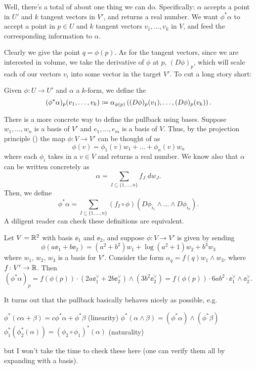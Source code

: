 Well, there's a total of about one thing we can do.
Specifically: $\alpha$ accepts a point in $U'$ and $k$ tangent vectors in $V'$,
and returns a real number.
We want $\phi^\ast \alpha$ to accept a point in $p \in U$
and $k$ tangent vectors $v_1, \dots, v_k$ in $V$,
and feed the corresponding information to $\alpha$.

Clearly we give the point $q = \phi(p)$.
As for the tangent vectors, since we are interested in volume, we take the
derivative of $\phi$ at $p$, $(D\phi)_p$, which will scale each of our vectors $v_i$
into some vector in the target $V'$.
To cut a long story short:
\begin{definition}
	Given $\phi \colon U \to U'$ and $\alpha$ a $k$-form, we define the 
	\[
		(\phi^\ast \alpha)_p(v_1, \dots, v_k)
		\coloneqq \alpha_{\phi(p)}
		\left( (D\phi)_p(v_1), \dots, (D\phi)_p(v_k) \right).
	\]
\end{definition}

There is a more concrete way to define the pullback using bases.
Suppose $w_1, \dots, w_n$ is a basis of $V'$
and $e_1, \dots, e_m$ is a basis of $V$.
Thus, by the projection principle ()
the map $\phi \colon V \to V'$ can be thought of as
\[ \phi(v) = \phi_1(v) w_1 + \dots + \phi_n(v) w_n \]
where each $\phi_i$ takes in a $v \in V$ and returns a real number.
We know also that $\alpha$ can be written concretely as
\[ \alpha = \sum_{I \subseteq \{1, \dots, n\}} f_J \; dw_J. \]
Then, we define
\[
	\phi^\ast\alpha
	= \sum_{I \subseteq \{1, \dots, n\}}
	(f_I \circ \phi) (D\phi_{i_1} \wedge \dots \wedge D\phi_{i_k}).
\]
A diligent reader can check these definitions are equivalent.
\begin{example}
	Let $V = \mathbb R^2$ with basis $\ee_1$ and $\ee_2$,
	and suppose $\phi \colon V \to V'$ is given by sending
	\[ \phi(a\ee_1 + b\ee_2) = (a^2+b^2)w_1 + \log(a^2+1) w_2 + b^3 w_3 \]
	where $w_1$, $w_2$, $w_3$ is a basis for $V'$.
	Consider the form $\alpha_q = f(q) w_1 \wedge w_3$, where $f \colon V' \to \mathbb R$.
	Then
	\[ (\phi^\ast\alpha)_p = f(\phi(p)) \cdot (2a \ee_1^\vee + 2b\ee_2^\vee) \wedge (3b^2 \ee_2^\vee)
		= f(\phi(p)) \cdot 6ab^2 \cdot \ee_1^\vee \wedge \ee_2^\vee. \]
\end{example}

It turns out that the pullback basically behaves nicely as possible, e.g.\
\begin{itemize}
	\ii $\phi^\ast(c\alpha + \beta) = c\phi^\ast \alpha + \phi^\ast\beta$ (linearity)
	\ii $\phi^\ast(\alpha\wedge\beta)
	= (\phi^\ast \alpha)\wedge(\phi^\ast \beta)$
	\ii $\phi_1^\ast(\phi_2^\ast(\alpha))
	= (\phi_2 \circ \phi_1)^\ast(\alpha)$ (naturality)
\end{itemize}
but I won't take the time to check these here
(one can verify them all by expanding with a basis).

